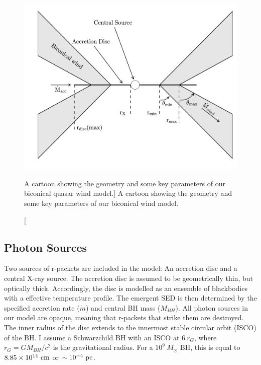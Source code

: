 \begin{figure} 
\centering
\includegraphics[width=1.0\textwidth]{figures/06-agnpaper/fig1.png}
\caption
[A cartoon showing the geometry and some key parameters of
our biconical quasar wind model.]
{
A cartoon showing the geometry and some key parameters of
our biconical wind model.
}
\label{fig:cartoon}
\end{figure} 

\subsection{Photon Sources}
\label{sec:photon_sources}

Two sources of r-packets are included in the model:
An accretion disc and a central X-ray source.
The accretion disc is assumed to be geometrically thin, 
but optically thick.
Accordingly, the disc is modelled as an ensemble of blackbodies with a 
\cite{shakurasunyaev1973} effective temperature profile. 
The emergent SED is then determined by the specified accretion rate ($\dot{m}$)
and central BH mass ($M_{BH}$).
All photon sources in our model are opaque, meaning
that r-packets that strike them are destroyed.
The inner radius of the disc extends to the innermost 
stable circular orbit (ISCO) of the BH. 
I assume a Schwarzchild BH with an ISCO at $6~r_G$, where 
$r_G = GM_{BH}/c^2$ is the gravitational radius.
For a $10^9~M_\odot$ BH, this is equal to $8.85\times10^{14}~{\rm cm}$ 
or $\sim10^{-4}~{\rm pc}$.  


